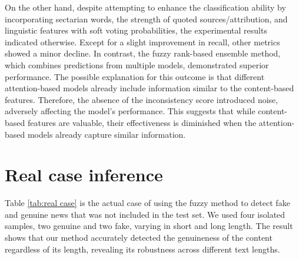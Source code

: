 On the other hand, despite attempting to enhance the classification ability by incorporating sectarian words, the strength of quoted sources/attribution, and linguistic features with soft voting probabilities, the experimental results indicated otherwise. Except for a slight improvement in recall, other metrics showed a minor decline. In contrast, the fuzzy rank-based ensemble method, which combines predictions from multiple models, demonstrated superior performance.
The possible explanation for this outcome is that different attention-based models already include information similar to the content-based features. Therefore, the absence of the inconsistency score introduced noise, adversely affecting the model's performance. This suggests that while content-based features are valuable, their effectiveness is diminished when the attention-based models already capture similar information.





\section{Real case inference}

Table \ref{tab:real case} is the actual case of using the fuzzy method to detect fake and genuine news that was not included in the test set. We used four isolated samples, two genuine and two fake, varying in short and long length. The result shows that our method accurately detected the genuineness of the content regardless of its length, revealing its robustness across different text lengths.


